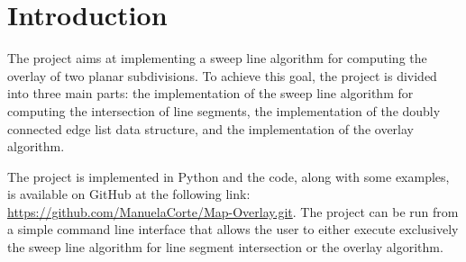 \section{Introduction}
The project aims at implementing a sweep line algorithm for computing the overlay of two planar subdivisions. To achieve this goal, the project is divided into three main parts: the implementation of the sweep line algorithm for computing the intersection of line segments, the implementation of the doubly connected edge list data structure, and the implementation of the overlay algorithm.

The project is implemented in Python and the code, along with some examples, is available on GitHub at the following link: \url{https://github.com/ManuelaCorte/Map-Overlay.git}. The project can be run from a simple command line interface that allows the user to either execute exclusively the sweep line algorithm for line segment intersection or the overlay algorithm.
